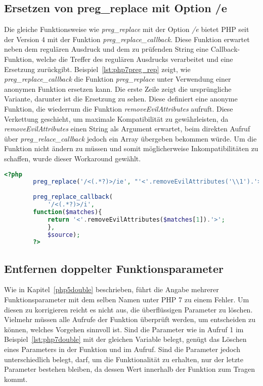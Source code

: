     \subsection{Ersetzen von preg\_replace mit Option /e}\label{preg}
    Die gleiche Funktionsweise wie \textit{preg\_replace} mit der Option \textit{/e} bietet \ac{PHP} seit der Version 4 mit der 
    Funktion \textit{preg\_replace\_callback}. Diese Funktion erwartet neben dem regulären Ausdruck und dem zu prüfenden 
    String eine Callback-Funktion, welche die Treffer des regulären Ausdrucks verarbeitet und eine Ersetzung zurückgibt.
    Beispiel~\ref{lst:php7preg_rep} zeigt, wie \textit{preg\_replace\_callback} die Funktion \textit{preg\_replace} unter 
    Verwendung einer anonymen Funktion ersetzen kann. Die erste Zeile zeigt die ursprüngliche Variante, darunter ist die 
    Ersetzung zu sehen. Diese definiert eine anonyme Funktion, die wiederrum die Funktion \textit{removeEvilAttributes} aufruft. 
    Diese Verkettung geschieht, um maximale Kompatibilität zu gewährleisten, da \textit{removeEvilAttributes} einen String 
    als Argument erwartet, beim direkten Aufruf über \textit{preg\_relace\_callback} jedoch ein Array übergeben bekommen würde. Um 
    die Funktion nicht ändern zu müssen und somit möglicherweise Inkompatibilitäten zu schaffen, wurde dieser Workaround 
    gewählt.
        
    \begin{lstlisting}[language=php, caption={Beispiel der Nutzung von preg\_replace\_callback}, label={lst:php7preg_rep}]
        <?php
        preg_replace('/<(.*?)>/ie', "'<'.removeEvilAttributes('\\1').'>'", $source);
        
        preg_replace_callback(
            '/<(.*?)>/i', 
        function($matches){
            return '<'.removeEvilAttributes($matches[1]).'>';
            },
            $source);
        ?>
    \end{lstlisting}
            
    \subsection{Entfernen doppelter Funktionsparameter}
    Wie in Kapitel~\ref{php5double} beschrieben, führt die Angabe mehrerer Funktionsparameter mit dem selben Namen unter \ac{PHP} 7 zu einem Fehler.
    Um diesen zu korrigieren reicht es nicht aus, die überflüssigen Parameter zu löschen. Vielmehr müssen alle Aufrufe der Funktion überprüft werden, 
    um entscheiden zu können, welches Vorgehen sinnvoll ist. Sind die Parameter wie in Aufruf 1 im Beispiel~\ref{lst:php7double} mit der gleichen Variable 
    belegt, genügt das Löschen eines Parameters in der Funktion und im Aufruf. Sind die Parameter jedoch unterschiedlich belegt, darf, um die Funktionalität 
    zu erhalten, nur der letzte Parameter bestehen bleiben, da dessen Wert innerhalb der Funktion zum Tragen kommt.
    
